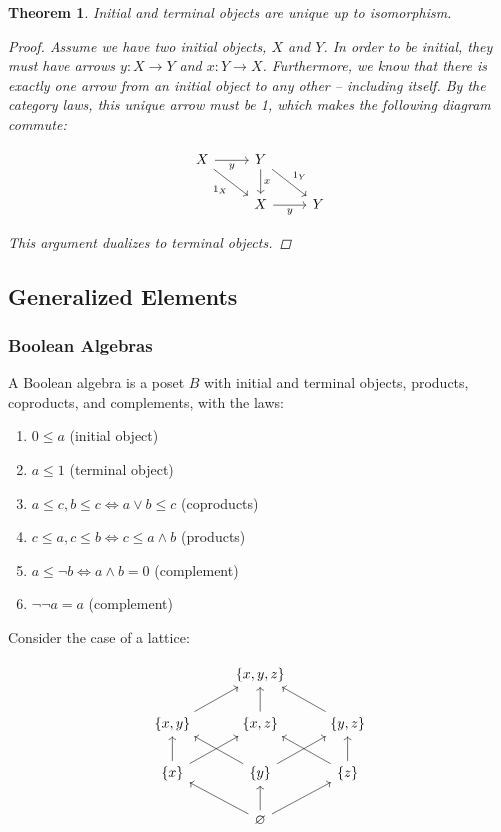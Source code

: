 \documentclass[]{article}
\newtheorem{theorem}{Theorem}
\newcommand{\cdr}[1]{\arrow[swap]{r}{#1}}
\newcommand{\cddr}[1]{\arrow[swap]{dr}{#1}}
\newcommand{\cdd}[1]{\arrow{d}{#1}}
\newcommand{\setn}[1]{\left\{#1\right\}}
\newcommand{\tfarr}[4][\to]{\ensuremath{#2 : #3 #1 #4}}
\begin{document}
\begin{theorem}
  Initial and terminal objects are unique up to isomorphism.
  \begin{proof}
    Assume we have two initial objects, $X$ and $Y$. In order to be initial,
    they must have arrows \tfarr{y}{X}{Y} and \tfarr{x}{Y}{X}. Furthermore, we
    know that there is exactly one arrow from an initial object to any other --
    including itself. By the category laws, this unique arrow must be 1, which
    makes the following diagram commute:

$$\begin{tikzcd}
  X \cdr{y} \cddr{1_X} & Y \cdd{x} \arrow{dr}{1_Y} \\
  & X \cdr{y} & Y
\end{tikzcd}$$

    This argument dualizes to terminal objects.

  \end{proof}
\end{theorem}

\subsection{Generalized Elements}

\subsubsection{Boolean Algebras}

A Boolean algebra is a poset $B$ with initial and terminal objects, products,
coproducts, and complements, with the laws:

\begin{enumerate}
  \item{$0 \leq a$ (initial object)}
  \item{$a \leq 1$ (terminal object)}
  \item{$a \leq c, b \leq c \iff a \vee b \leq c$ (coproducts)}
  \item{$c \leq a, c \leq b \iff c \leq a \wedge b$ (products)}
  \item{$a \leq \neg b \iff a \wedge b = 0 $ (complement)}
  \item{$\neg \neg a = a $ (complement)}
\end{enumerate}

Consider the case of a lattice:

$$\begin{tikzcd}
  & \setn{x, y, z} & \\
  \setn{x, y} \arrow{ur} & \setn{x, z} \arrow{u} & \setn{y, z} \arrow{ul} \\
  \setn{x} \arrow{u}\arrow{ur} & \setn{y}\arrow{ul}\arrow{ur} &
  \setn{z}\arrow{ul}\arrow{u} \\
  & \varnothing \arrow{ul}\arrow{u}\arrow{ur} &
\end{tikzcd}$$
\end{document}
